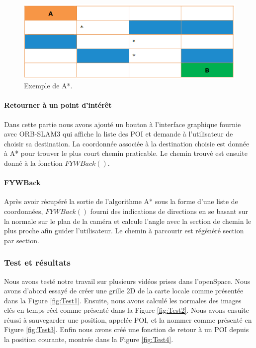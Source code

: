 \documentclass[11pt]{article}
\begin{document}
          \clearpage
          
          \begin{figure}[hbt]  
            \includegraphics[width=\textwidth]{Astar.png}    
            \caption{Exemple de A*.}
            \label{fig:Astar}
          \end{figure}      

        \paragraph{Retourner à un point d'intérêt}
          Dans cette partie nous avons ajouté un bouton à l'interface graphique fournie avec ORB-SLAM3 qui affiche la liste des POI et 
          demande à l'utilisateur de choisir sa destination. La coordonnée associée à la destination choisie est donnée à A* pour trouver
          le plus court chemin praticable. Le chemin trouvé est ensuite donné à la fonction $FYWBack()$.          

        \paragraph{FYWBack}
            Après avoir récupéré la sortie de l'algorithme A* sous la forme d'une liste de coordonnées, $FYWBack()$ fourni des indications
            de directions en se basant sur la normale sur le plan de la caméra et calcule l'angle avec la section de chemin le plus proche
            afin guider l'utilisateur. Le chemin à parcourir est régénéré section par section.            
      
      \subsubsection{Test et résultats}
        Nous avons testé notre travail sur plusieurs vidéos prises dans l'openSpace. Nous avons d'abord essayé de créer une grille 2D de la 
        carte locale comme présentée dans la Figure \ref{fig:Test1}. Ensuite, nous avons calculé les normales des images clés en temps réel 
        comme présenté dans la Figure \ref{fig:Test2}. Nous avons ensuite réussi à sauvegarder une position, appelée POI, et la nommer comme
        présenté en Figure \ref{fig:Test3}. Enfin nous avons créé une fonction de retour à un POI depuis la position courante, montrée dans la 
        Figure \ref{fig:Test4}.      
\end{document}
